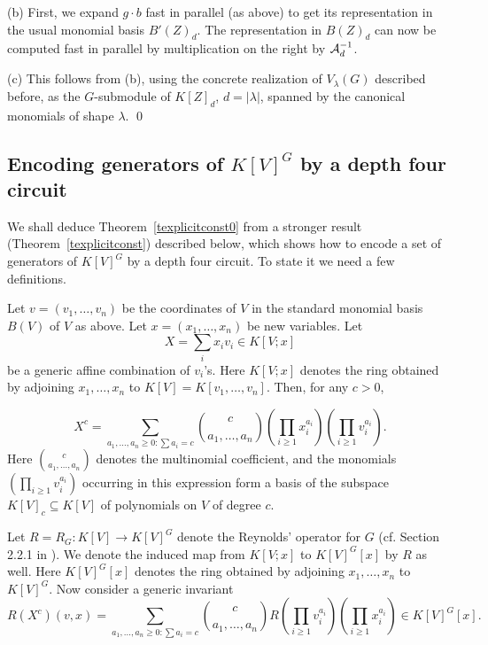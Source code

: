 \documentclass[11pt]{article}
\begin{document}
\noindent (b) First, we expand $g \cdot b$ fast in parallel (as above) to get its
representation in the usual monomial basis $B'(Z)_d$.
The representation in $B(Z)_d$ can now be computed fast in parallel
by multiplication on the right by ${\cal A}^{-1}_d$.

\noindent (c) 
This follows from (b),  using  the concrete realization of $V_\lambda(G)$ described before,
as the $G$-submodule of  $K[Z]_d$, $d=|\lambda|$,  spanned by the canonical 
 monomials of shape $\lambda$.
\qed

\subsection{Encoding generators of $K[V]^G$ by a depth four  circuit} \label{sencode}
We shall deduce Theorem~\ref{texplicitconst0} from a stronger result (Theorem~\ref{texplicitconst}) described below, which  shows how 
to encode a set of generators of $K[V]^G$ by a depth four   circuit. To state it we need a 
few definitions.

Let $v=(v_1,\ldots,v_n)$ be the  coordinates of  $V$ in the standard monomial basis $B(V)$ of $V$ as above.
Let $x = (x_1,\ldots,x_n)$ be new variables.
Let 
\begin{equation} \label{eqX}
X=  \sum_i x_i v_i \in K[V;  x]
\end{equation}
be a generic affine combination of $v_i$'s.
Here $K[V;x]$ denotes the ring obtained by adjoining $x_1,\ldots,x_n$ to $K[V]=K[v_1,\ldots,v_n]$.
Then, for any $c>0$,

\begin{equation} \label{eqgeneric}
 X^c= \sum_{a_1,\ldots,a_n \ge 0: \sum a_i = c} {c \choose a_1,\ldots,a_n} (\prod_{i\ge 1} x_i^{a_i}) 
(\prod_{i \ge 1} v_i^{a_i}).
\end{equation}
Here ${c \choose a_1,\ldots,a_n}$ denotes the multinomial coefficient, and the monomials 
$(\prod_{i \ge 1} v_i^{a_i})$ occurring in this expression form a basis of
the subspace $K[V]_c \subseteq K[V]$ of polynomials on $V$ of degree $c$.

Let $R=R_G:K[V]\rightarrow K[V]^G$ denote the Reynolds' operator for $G$ (cf. Section 2.2.1 in \cite{derksenbook}).
We denote the induced map from $K[V; x]$ to $K[V]^G[x]$ by $R$ as well.
Here $K[V]^G[x]$ denotes the ring obtained by adjoining $x_1,\ldots,x_n$ to $K[V]^G$.
Now consider a generic invariant 
\begin{equation}  \label{eqgeneric2}
R(X^c)(v,x) =
\sum_{a_1,\ldots,a_n \ge 0: \sum a_i =c} {c \choose a_1,\ldots,a_n} 
R(\prod_{i \ge 1} v_i^{a_i}) (\prod_{i\ge 1} x_i^{a_i}) \in K[V]^G[x].
\end{equation}
\end{document}
